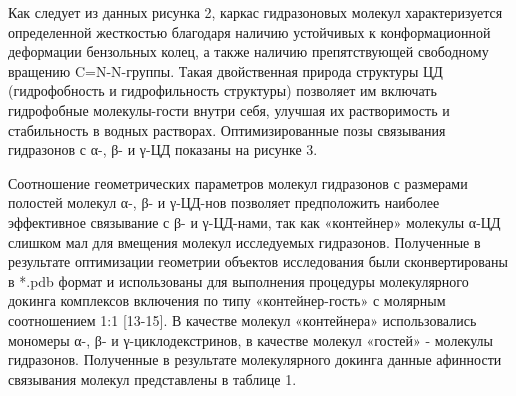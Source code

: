 \begin{multicols}{2}
Как следует из данных рисунка 2, каркас гидразоновых молекул
характеризуется определенной жесткостью благодаря наличию устойчивых к
конформационной деформации бензольных колец, а также наличию
препятствующей свободному вращению C=N-N-группы. Такая двойственная
природа структуры ЦД (гидрофобность и гидрофильность структуры)
позволяет им включать гидрофобные молекулы-гости внутри себя, улучшая их
растворимость и стабильность в водных растворах. Оптимизированные позы
связывания гидразонов с α-, β- и γ-ЦД показаны на рисунке 3.

Соотношение геометрических параметров молекул гидразонов с размерами
полостей молекул α-, β- и γ-ЦД-нов позволяет предположить наиболее
эффективное связывание с β- и γ-ЦД-нами, так как «контейнер» молекулы
α-ЦД слишком мал для вмещения молекул исследуемых гидразонов. Полученные
в результате оптимизации геометрии объектов исследования были
сконвертированы в *.pdb формат и использованы для выполнения процедуры
молекулярного докинга комплексов включения по типу «контейнер-гость» с
молярным соотношением 1:1 {[}13-15{]}. В качестве молекул «контейнера»
использовались мономеры α-, β- и γ-циклодекстринов, в качестве молекул
«гостей» - молекулы гидразонов. Полученные в результате молекулярного
докинга данные афинности связывания молекул представлены в таблице 1.
\end{multicols}

